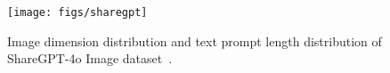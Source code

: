 \begin{figure}[!t]
    \centering
    \texttt{[image: figs/sharegpt]}
    \caption{Image dimension distribution and text prompt length distribution of ShareGPT-4o Image dataset~\cite{chen2024far}.
    }
    \label{fig:sharegpt}
\end{figure}